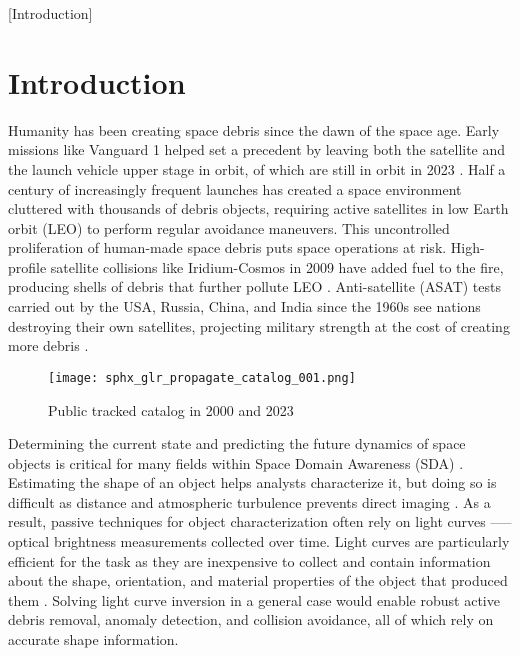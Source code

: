 [Introduction]
\graphicspath{{/Users/liamrobinson/Documents/PyLightCurves/docs/build/html/_images}}
\chapter{Introduction}

Humanity has been creating space debris since the dawn of the space age. Early missions like Vanguard 1 helped set a precedent by leaving both the satellite and the launch vehicle upper stage in orbit, of which are still in orbit in 2023 \cite{vanguard1}. Half a century of increasingly frequent launches has created a space environment cluttered with thousands of debris objects, requiring active satellites in low Earth orbit (LEO) to perform regular avoidance maneuvers. This uncontrolled proliferation of human-made space debris puts space operations at risk. High-profile satellite collisions like Iridium-Cosmos in 2009 have added fuel to the fire, producing shells of debris that further pollute LEO \cite{vallado4ed}. Anti-satellite (ASAT) tests carried out by the USA, Russia, China, and India since the 1960s see nations destroying their own satellites, projecting military strength at the cost of creating more debris \cite{vallado4ed}.

\begin{figure}[ht]
    \centering
    \texttt{[image: sphx\_glr\_propagate\_catalog\_001.png]}
    \caption{Public tracked catalog in 2000 and 2023}
    \label{fig:catalog_comparison}
\end{figure}

Determining the current state and predicting the future dynamics of space objects is critical for many fields within Space Domain Awareness (SDA) \cite{frueh2019notes}. Estimating the shape of an object helps analysts characterize it, but doing so is difficult as distance and atmospheric turbulence prevents direct imaging \cite{fan2020thesis}. As a result, passive techniques for object characterization often rely on light curves --— optical brightness measurements collected over time. Light curves are particularly efficient for the task as they are inexpensive to collect and contain information about the shape, orientation, and material properties of the object that produced them \cite{fan2020thesis, burton2021mapping}. Solving light curve inversion in a general case would enable robust active debris removal, anomaly detection, and collision avoidance, all of which rely on accurate shape information.

